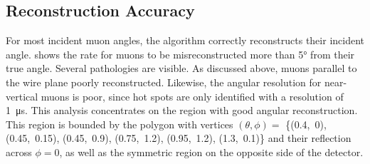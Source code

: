 \documentclass[herrin-thesis.tex]{subfiles}
\begin{document}
\subsection{Reconstruction Accuracy}
For most incident muon angles, the algorithm correctly reconstructs their incident angle.  shows the rate for muons to be misreconstructed more than \ang{5} from their true angle. Several pathologies are visible. As discussed above, muons parallel to the wire plane poorly reconstructed. Likewise, the angular resolution for near-vertical muons is poor, since hot spots are only identified with a resolution of \SI{1}{\micro\s}. This analysis concentrates on the region with good angular reconstruction. This region is bounded by the polygon with vertices \((\theta,\phi) =\) \{(0.4,~0), (0.45,~0.15), (0.45,~0.9), (0.75,~1.2), (0.95,~1.2), (1.3,~0.1)\} and their reflection  across \(\phi=0\), as well as the symmetric region on the opposite side of the detector.
\end{document}
